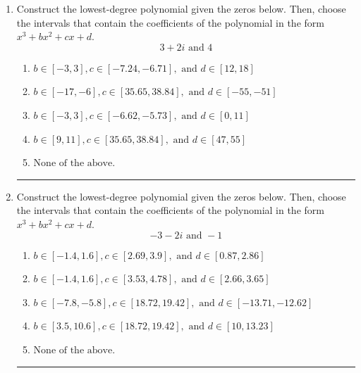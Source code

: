\documentclass[14pt]{extbook}
\newcommand{\litem}[1]{\item#1\hspace*{-1cm}\rule{\textwidth}{0.4pt}}
\begin{document}
\begin{enumerate}
{\begin{enumerate}[label=\Alph*.]
\end{enumerate} }
\litem{
Construct the lowest-degree polynomial given the zeros below. Then, choose the intervals that contain the coefficients of the polynomial in the form $x^3+bx^2+cx+d$.\[ 3 + 2 i \text{ and } 4 \]\begin{enumerate}[label=\Alph*.]
\item \( b \in [-3, 3], c \in [-7.24, -6.71], \text{ and } d \in [12, 18] \)
\item \( b \in [-17, -6], c \in [35.65, 38.84], \text{ and } d \in [-55, -51] \)
\item \( b \in [-3, 3], c \in [-6.62, -5.73], \text{ and } d \in [0, 11] \)
\item \( b \in [9, 11], c \in [35.65, 38.84], \text{ and } d \in [47, 55] \)
\item \( \text{None of the above.} \)

\end{enumerate} }
\litem{
Construct the lowest-degree polynomial given the zeros below. Then, choose the intervals that contain the coefficients of the polynomial in the form $x^3+bx^2+cx+d$.\[ -3 - 2 i \text{ and } -1 \]\begin{enumerate}[label=\Alph*.]
\item \( b \in [-1.4, 1.6], c \in [2.69, 3.9], \text{ and } d \in [0.87, 2.86] \)
\item \( b \in [-1.4, 1.6], c \in [3.53, 4.78], \text{ and } d \in [2.66, 3.65] \)
\item \( b \in [-7.8, -5.8], c \in [18.72, 19.42], \text{ and } d \in [-13.71, -12.62] \)
\item \( b \in [3.5, 10.6], c \in [18.72, 19.42], \text{ and } d \in [10, 13.23] \)
\item \( \text{None of the above.} \)


\end{enumerate}}
\end{enumerate}
\end{document}
